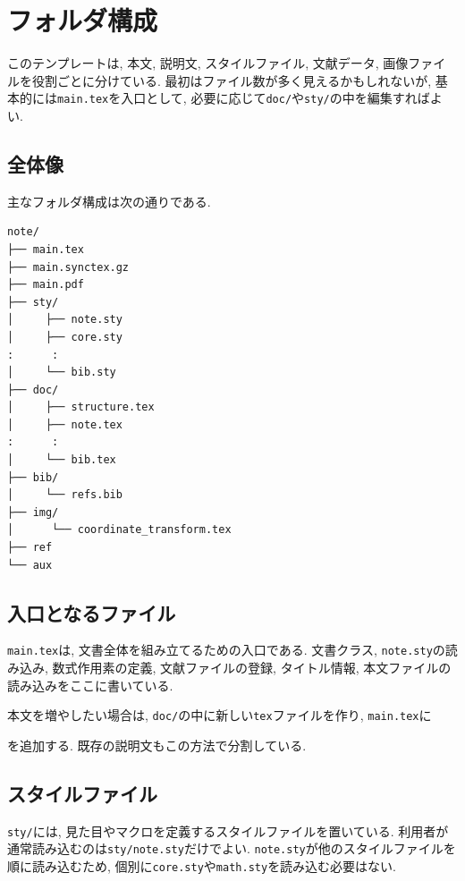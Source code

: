 \documentclass[../main.tex]{subfiles}
\begin{document}
\section{フォルダ構成}

このテンプレートは, 本文, 説明文, スタイルファイル, 文献データ, 画像ファイルを役割ごとに分けている. 
最初はファイル数が多く見えるかもしれないが, 基本的には\texttt{main.tex}を入口として, 必要に応じて\texttt{doc/}や\texttt{sty/}の中を編集すればよい. 

\subsection{全体像}

主なフォルダ構成は次の通りである. 

\begin{verbatim}
note/
├── main.tex
├── main.synctex.gz
├── main.pdf
├── sty/
│     ├── note.sty
│     ├── core.sty
:      :
│     └── bib.sty
├── doc/
│     ├── structure.tex
│     ├── note.tex
:      :
│     └── bib.tex
├── bib/
│     └── refs.bib
├── img/
│      └── coordinate_transform.tex
├── ref
└── aux
\end{verbatim}

\subsection{入口となるファイル}

\texttt{main.tex}は, 文書全体を組み立てるための入口である. 
文書クラス, \texttt{note.sty}の読み込み, 数式作用素の定義, 文献ファイルの登録, タイトル情報, 本文ファイルの読み込みをここに書いている. 

本文を増やしたい場合は, \texttt{doc/}の中に新しい\texttt{tex}ファイルを作り, \texttt{main.tex}に
\begin{center}
	\verb||
\end{center}
を追加する. 
既存の説明文もこの方法で分割している. 

\subsection{スタイルファイル}

\texttt{sty/}には, 見た目やマクロを定義するスタイルファイルを置いている. 
利用者が通常読み込むのは\texttt{sty/note.sty}だけでよい. 
\texttt{note.sty}が他のスタイルファイルを順に読み込むため, 個別に\texttt{core.sty}や\texttt{math.sty}を読み込む必要はない. 
\end{document}
